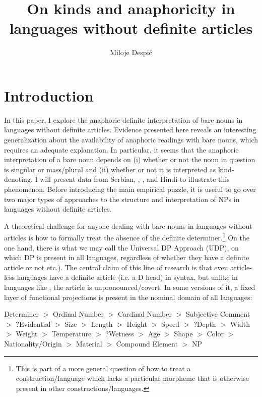 \documentclass[output=paper,
modfonts
]{langscibook}
\title{On kinds and anaphoricity in languages without definite articles}
\author{Miloje Despić\affiliation{Cornell University}}
\begin{document}
	\maketitle
	\section{Introduction}\largerpage[-2]
	In this paper, I explore the anaphoric definite interpretation of bare nouns in languages without definite articles. Evidence presented here reveals an interesting generalization about the availability of anaphoric readings with bare nouns, which requires an adequate explanation. In particular, it seems that the anaphoric interpretation of a bare noun depends on (i) whether or not the noun in question is singular or mass/plural and (ii) whether or not it is interpreted as kind-denoting. I will present data from Serbian, , ,  and Hin\-di to illustrate this phenomenon. Before introducing the main empirical puzzle, it is useful to go over two major types of approaches to the structure and interpretation of NPs in languages without definite articles.
	
	A theoretical challenge for anyone dealing with bare nouns in languages without articles is how to formally treat the absence of the definite determiner.\footnote{This is part of a more general question of how to treat a construction/language which lacks a particular morpheme that is otherwise present in other constructions/languages.}  On the one hand, there is what we may call the Universal DP Approach (UDP), on which DP is present in all languages, regardless of whether they have a definite article or not  \citep[e.g.][]{Longobardi1994,Cinque1994,Scott2002,Pereltsvaig2007} etc.). The central claim of this line of research is that even article-less languages have a definite article (i.e. a D head) in syntax, but unlike in languages like , the article is unpronounced/covert. In some versions of it, a fixed layer of functional projections is present in the nominal domain of all languages:
	
	\ea \label{ex:despic:1} 
	{Determiner} $>$ {Ordinal Number} $>$ {Cardinal Number} $>$ {Subjective Comment} $>$ {?Evidential} $>$ {Size} $>$ {Length} $>$ {Height} $>$ {Speed} $>$ {?Depth} $>$ {Width} $>$ {Weight} $>$ {Temperature} $>$ {?Wetness} $>$ {Age} $>$ {Shape} $>$ {Color} $>$ {Nationality/Origin} $>$ {Material} $>$ {Compound Element} $>$ {NP}	\citep[114]{Scott2002} 
	\z\largerpage[-3]
	
\end{document}
